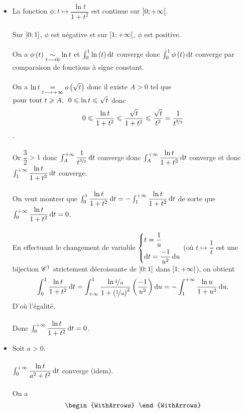 \begin{corr}
\begin{itemize}
    \item La fonction \(\phi:t\mapsto\dfrac{\ln t}{1+t^2}\) est continue sur \(\intervee{0}{\pinf}\). \\\\ Sur \(\intervei{0}{1}\), \(\phi\) est négative et sur \(\intervie{1}{\pinf}\), \(\phi\) est positive. \\\\ On a \(\phi\paren{t}\simqd{t\to0}\ln t\) et \(\int_0^1\ln\paren{t}\odif{t}\) converge donc \(\int_0^1\phi\paren{t}\odif{t}\) converge par comparaison de fonctions à signe constant. \\\\ On a \(\ln t\egqd{t\to\pinf}\o{\sqrt{t}}\) donc il existe \(A>0\) tel que \(\quantifs{\tpt t\geq A}0\leq\ln t\leq\sqrt{t}\) donc \[0\leq\dfrac{\ln t}{1+t^2}\leq\dfrac{\sqrt{t}}{1+t^2}\leq\dfrac{\sqrt{t}}{t^2}=\dfrac{1}{t^{\nicefrac{3}{2}}}\]. \\\\ Or \(\dfrac{3}{2}>1\) donc \(\int_A^{\pinf}\dfrac{1}{t^{\nicefrac{3}{2}}}\odif{t}\) converge donc \(\int_A^{\pinf}\dfrac{\ln t}{1+t^2}\odif{t}\) converge et donc \(\int_1^{\pinf}\dfrac{\ln t}{1+t^2}\odif{t}\) converge. \\\\ On veut montrer que \(\int_0^1\dfrac{\ln t}{1+t^2}\odif{t}=-\int_1^{\pinf}\dfrac{\ln t}{1+t^2}\odif{t}\) de sorte que \(\int_0^{\pinf}\dfrac{\ln t}{1+t^2}\odif{t}=0\). \\\\ En effectuant le changement de variable \(\begin{dcases}
        t=\dfrac{1}{u} \\
        \odif{t}=\dfrac{-1}{u^2}\odif{u}
    \end{dcases}\) (où \(t\mapsto\dfrac{1}{t}\) est une bijection \(\classe{1}\) strictement décroissante de \(\intervei{0}{1}\) dans \(\intervie{1}{\pinf}\)), on obtient \[\int_0^1\dfrac{\ln t}{1+t^2}\odif{t}=\int_{\pinf}^1\dfrac{\ln\nicefrac{1}{u}}{1+\paren{\nicefrac{1}{u}}^2}\paren{\dfrac{-1}{u^2}}\odif{u}=-\int_1^{\pinf}\dfrac{\ln u}{1+u^2}\odif{u}.\] D'où l'égalité. \\\\ Donc \(\int_0^{\pinf}\dfrac{\ln t}{1+t^2}\odif{t}=0\). \\
    \item Soit \(a>0\). \\\\ \(\int_0^{\pinf}\dfrac{\ln t}{a^2+t^2}\odif{t}\) converge (idem). \\\\ On a \[\begin{WithArrows}

\end{WithArrows}\]
\end{itemize}
\end{corr}
